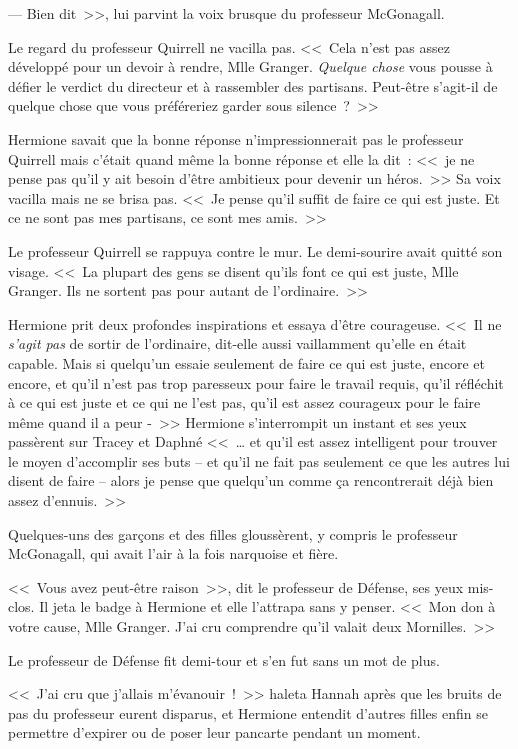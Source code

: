 --- Bien dit~>>, lui parvint la voix brusque du professeur McGonagall.

Le regard du professeur Quirrell ne vacilla pas. <<~Cela n'est pas assez développé pour un devoir à rendre, Mlle Granger. \emph{Quelque chose} vous pousse à défier le verdict du directeur et à rassembler des partisans. Peut-être s'agit-il de quelque chose que vous préféreriez garder sous silence~?~>>

Hermione savait que la bonne réponse n'impressionnerait pas le professeur Quirrell mais c'était quand même la bonne réponse et elle la dit~: <<~je ne pense pas qu'il y ait besoin d'être ambitieux pour devenir un héros.~>> Sa voix vacilla mais ne se brisa pas. <<~Je pense qu'il suffit de faire ce qui est juste. Et ce ne sont pas mes partisans, ce sont mes amis.~>>

Le professeur Quirrell se rappuya contre le mur. Le demi-sourire avait quitté son visage. <<~La plupart des gens se disent qu'ils font ce qui est juste, Mlle Granger. Ils ne sortent pas pour autant de l'ordinaire.~>>

Hermione prit deux profondes inspirations et essaya d'être courageuse. <<~Il ne \emph{s'agit pas} de sortir de l'ordinaire, dit-elle aussi vaillamment qu'elle en était capable. Mais si quelqu'un essaie seulement de faire ce qui est juste, encore et encore, et qu'il n'est pas trop paresseux pour faire le travail requis, qu'il réfléchit à ce qui est juste et ce qui ne l'est pas, qu'il est assez courageux pour le faire même quand il a peur -~>> Hermione s'interrompit un instant et ses yeux passèrent sur Tracey et Daphné <<~… et qu'il est assez intelligent pour trouver le moyen d'accomplir ses buts -- et qu'il ne fait pas seulement ce que les autres lui disent de faire -- alors je pense que quelqu'un comme ça rencontrerait déjà bien assez d'ennuis.~>>

Quelques-uns des garçons et des filles gloussèrent, y compris le professeur McGonagall, qui avait l'air à la fois narquoise et fière.

<<~Vous avez peut-être raison~>>, dit le professeur de Défense, ses yeux mis-clos. Il jeta le badge à Hermione et elle l'attrapa sans y penser. <<~Mon don à votre cause, Mlle Granger. J'ai cru comprendre qu'il valait deux Mornilles.~>>

Le professeur de Défense fit demi-tour et s'en fut sans un mot de plus.

<<~J'ai cru que j'allais m'évanouir~!~>> haleta Hannah après que les bruits de pas du professeur eurent disparus, et Hermione entendit d'autres filles enfin se permettre d'expirer ou de poser leur pancarte pendant un moment.

